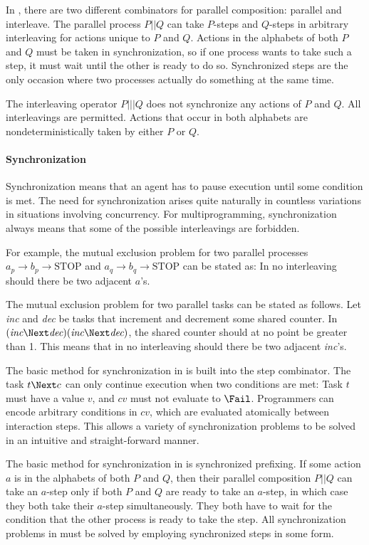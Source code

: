 In \CSP, there are two different combinators for parallel composition: parallel and interleave.
The parallel process $P || Q$ can take $P$-steps and $Q$-steps in arbitrary interleaving for actions unique to $P$ and $Q$.
Actions in the alphabets of both $P$ and $Q$ must be taken in synchronization, so if one process wants to take such a step, it must wait until the other is ready to do so.
Synchronized steps are the only occasion where two processes actually do something at the same time.

The interleaving operator $P ||| Q$ does not synchronize any actions of $P$ and $Q$.
All interleavings are permitted.
Actions that occur in both alphabets are nondeterministically taken by either $P$ or $Q$.


\paragraph{Synchronization}

Synchronization means that an agent has to pause execution until some condition is met.
The need for synchronization arises quite naturally in countless variations in situations involving concurrency.
For multiprogramming, synchronization always means that some of the possible interleavings are forbidden.

For example, the mutual exclusion problem for two parallel processes $a_p \to b_p \to \text{STOP} $ and $a_q \to b_q \to \text{STOP}$ can be stated as:
In no interleaving should there be two adjacent $a$'s.

The mutual exclusion problem for two parallel tasks can be stated as follows.
Let \textit{inc} and \textit{dec} be tasks that increment and decrement some shared counter.
In $(\textit{inc} \Next \textit{dec}) \And (\textit{inc} \Next \textit{dec})$, the shared counter should at no point be greater than 1.
This means that in no interleaving should there be two adjacent \textit{inc}'s.

The basic method for synchronization in \TOP is built into the step combinator.
The task $t \Next c$ can only continue execution when two conditions are met:
Task $t$ must have a value $v$, and $cv$ must not evaluate to $\Fail$.
Programmers can encode arbitrary conditions in $cv$, which are evaluated atomically between interaction steps.
This allows a variety of synchronization problems to be solved in an intuitive and straight-forward manner.

The basic method for synchronization in \CSP is synchronized prefixing.
If some action $a$ is in the alphabets of both $P$ and $Q$, then their parallel composition $P||Q$ can take an $a$-step only if both $P$ and $Q$ are ready to take an $a$-step, in which case they both take their $a$-step simultaneously.
They both have to wait for the condition that the other process is ready to take the step.
All synchronization problems in \CSP must be solved by employing synchronized steps in some form.



